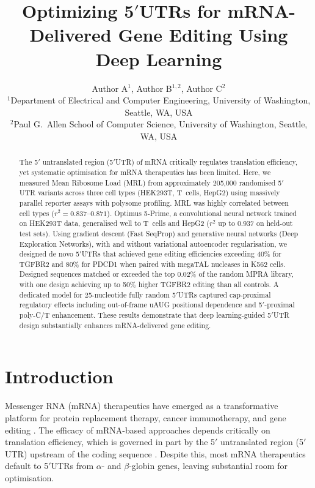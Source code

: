 \documentclass[11pt]{article}
\title{Optimizing 5$'$UTRs for mRNA-Delivered Gene Editing Using Deep Learning}
\author{Author A$^{1}$, Author B$^{1,2}$, Author C$^{2}$\\
\small $^{1}$Department of Electrical and Computer Engineering, University of Washington, Seattle, WA, USA\\
\small $^{2}$Paul G.\ Allen School of Computer Science, University of Washington, Seattle, WA, USA}
\date{}
\begin{document}
\maketitle

\begin{abstract}
The 5$'$ untranslated region (5$'$UTR) of mRNA critically regulates translation efficiency, yet systematic optimisation for mRNA therapeutics has been limited. Here, we measured Mean Ribosome Load (MRL) from approximately 205,000 randomised 5$'$UTR variants across three cell types (HEK293T, T~cells, HepG2) using massively parallel reporter assays with polysome profiling. MRL was highly correlated between cell types ($r^2 = 0.837$--$0.871$). Optimus 5-Prime, a convolutional neural network trained on HEK293T data, generalised well to T~cells and HepG2 ($r^2$ up to $0.937$ on held-out test sets). Using gradient descent (Fast SeqProp) and generative neural networks (Deep Exploration Networks), with and without variational autoencoder regularisation, we designed de novo 5$'$UTRs that achieved gene editing efficiencies exceeding 40\% for TGFBR2 and 80\% for PDCD1 when paired with megaTAL nucleases in K562 cells. Designed sequences matched or exceeded the top 0.02\% of the random MPRA library, with one design achieving up to 50\% higher TGFBR2 editing than all controls. A dedicated model for 25-nucleotide fully random 5$'$UTRs captured cap-proximal regulatory effects including out-of-frame uAUG positional dependence and 5$'$-proximal poly-C/T enhancement. These results demonstrate that deep learning-guided 5$'$UTR design substantially enhances mRNA-delivered gene editing.
\end{abstract}

\section{Introduction}

Messenger RNA (mRNA) therapeutics have emerged as a transformative platform for protein replacement therapy, cancer immunotherapy, and gene editing \citep{sahin2014mrna, pardi2018mrna, polack2020safety}. The efficacy of mRNA-based approaches depends critically on translation efficiency, which is governed in part by the 5$'$ untranslated region (5$'$UTR) upstream of the coding sequence \citep{hinnebusch2014molecular, leppek2018functional}. Despite this, most mRNA therapeutics default to 5$'$UTRs from $\alpha$- and $\beta$-globin genes, leaving substantial room for optimisation.
\end{document}
